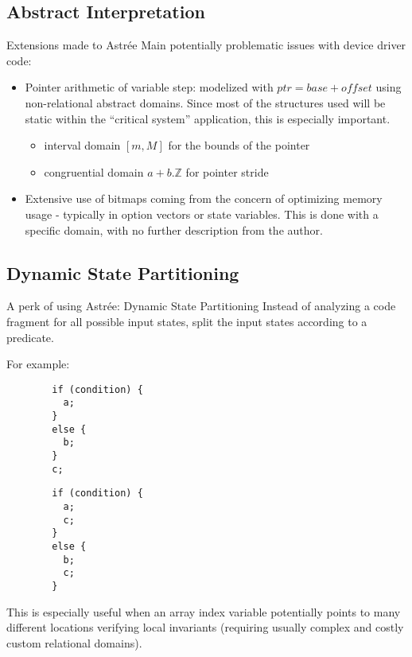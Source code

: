 \documentclass[aspectratio=169]{beamer}
\begin{document}
\subsection{Abstract Interpretation}
\begin{frame}{Extensions made to Astrée}
    Main potentially problematic issues with device driver code:
    \begin{itemize}
        \item Pointer arithmetic of variable step: modelized with $ptr = base + offset$ using non-relational abstract domains.
        Since most of the structures used will be static within the ``critical system'' application, this is especially important.
        \begin{itemize}
            \item interval domain $[m, M]$ for the bounds of the pointer
            \item congruential domain $a + b.\mathbb{Z}$ for pointer stride
        \end{itemize}
        \item Extensive use of bitmaps coming from the concern of optimizing memory usage - typically in option vectors or 
        state variables. This is done with a specific domain, with no further description from the author.
    \end{itemize}
\end{frame}

\subsection{Dynamic State Partitioning}
\begin{frame}[fragile]{A perk of using Astrée: Dynamic State Partitioning}
    Instead of analyzing a code fragment for all possible input states, split the input states according to a predicate.

    For example:
    \begin{minipage}{0.5\textwidth}
    \begin{verbatim}
        if (condition) {
          a;
        }
        else {
          b;
        }
        c;
    \end{verbatim}
    \end{minipage}%
    \begin{minipage}{0.5\textwidth}
    \begin{verbatim}
        if (condition) {
          a;
          c;
        }
        else {
          b;
          c;
        }
    \end{verbatim}
    \end{minipage}
    This is especially useful when an array index variable potentially points to many different locations verifying local invariants (requiring usually complex and costly custom relational domains).
\end{frame}
\end{document}
